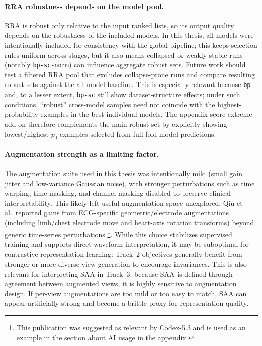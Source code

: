 \paragraph{RRA robustness depends on the model pool.}
RRA is robust only relative to the input ranked lists, so its output quality depends on the robustness of the included models.
In this thesis, all models were intentionally included for consistency with the global pipeline; this keeps selection rules uniform across stages, but it also means collapsed or weakly stable runs (notably \texttt{bp-sc-norm}) can influence aggregate robust sets.
Future work should test a filtered RRA pool that excludes collapse-prone runs and compare resulting robust sets against the all-model baseline.
This is especially relevant because \texttt{bp} and, to a lesser extent, \texttt{bp-sc} still show dataset-structure effects; under such conditions, ``robust'' cross-model samples need not coincide with the highest-probability examples in the best individual models.
The appendix score-extreme add-on therefore complements the main robust set by explicitly showing lowest/highest-\(p_0\) examples selected from full-fold model predictions.

\paragraph{Augmentation strength as a limiting factor.}
The augmentation suite used in this thesis was intentionally mild (small gain jitter and low-variance Gaussian noise), with stronger perturbations such as time warping, time masking, and channel masking disabled to preserve clinical interpretability.
This likely left useful augmentation space unexplored: Qiu et al.\ reported gains from ECG-specific geometric/electrode augmentations (including limb/chest electrode move and heart-axis rotation transforms) beyond generic time-series perturbations \parencite{qiu_augmentation_2022}\footnote{This publication was suggested as relevant by Codex-5.3 and is used as an example in the section about AI usage in the appendix.}.
While this choice stabilizes supervised training and supports direct waveform interpretation, it may be suboptimal for contrastive representation learning: Track~2 objectives generally benefit from stronger or more diverse view generation to encourage invariances.
This is also relevant for interpreting SAA in Track~3: because SAA is defined through agreement between augmented views, it is highly sensitive to augmentation design.
If per-view augmentations are too mild or too easy to match, SAA can appear artificially strong and become a brittle proxy for representation quality.

